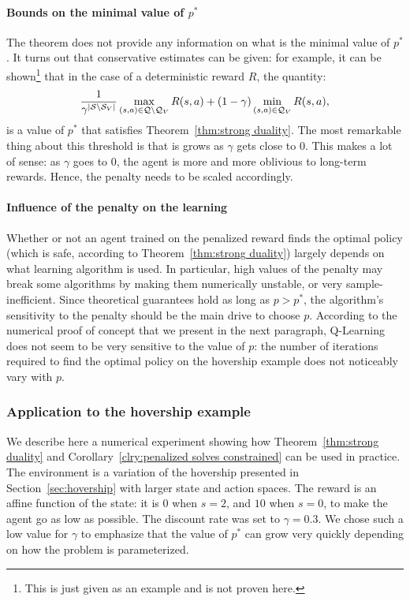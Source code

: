 \paragraph{Bounds on the minimal value of $p^*$} \label{sec:gamma p trade off} The theorem does not provide any information on what is the minimal value of $p^*$. It turns out that conservative estimates can be given: for example, it can be shown\footnote{This is just given as an example and is not proven here.} that in the case of a deterministic reward $R$, the quantity: 
$$
	\frac{1}{\gamma^{|\mathcal{S}\setminus{\ensuremath{\mathcal{S}}_{V}}|}}\max_{(s,a)\in\mathcal{Q}\setminus\mathcal{Q}_{V}}R(s, a) + (1 - \gamma)\min_{(s, a)\in\mathcal{Q}_{V}}R(s, a),
$$
is a value of $p^*$ that satisfies Theorem~\ref{thm:strong duality}. The most remarkable thing about this threshold is that is grows as $\gamma$ gets close to $0$. This makes a lot of sense: as $\gamma$ goes to $0$, the agent is more and more oblivious to long-term rewards. Hence, the penalty needs to be scaled accordingly.

\paragraph{Influence of the penalty on the learning} Whether or not an agent trained on the penalized reward finds the optimal policy (which is safe, according to Theorem~\ref{thm:strong duality}) largely depends on what learning algorithm is used. In particular, high values of the penalty may break some algorithms by making them numerically unstable, or very sample-inefficient. Since theoretical guarantees hold as long as $p > p^*$, the algorithm's sensitivity to the penalty should be the main drive to choose $p$. According to the numerical proof of concept that we present in the next paragraph, Q-Learning does not seem to be very sensitive to the value of $p$: the number of iterations required to find the optimal policy on the hovership example does not noticeably vary with $p$.

\subsubsection{Application to the hovership example} \label{sec:hovership example}
We describe here a numerical experiment showing how Theorem~\ref{thm:strong duality} and Corollary~\ref{clry:penalized solves constrained} can be used in practice. The environment is a variation of the hovership presented in Section~\ref{sec:hovership} with larger state and action spaces. The reward is an affine function of the state: it is $0$ when $s=2$, and $10$ when $s=0$, to make the agent go as low as possible. The discount rate was set to $\gamma = 0.3$. We chose such a low value for $\gamma$ to emphasize that the value of $p^*$ can grow very quickly depending on how the problem is parameterized.

